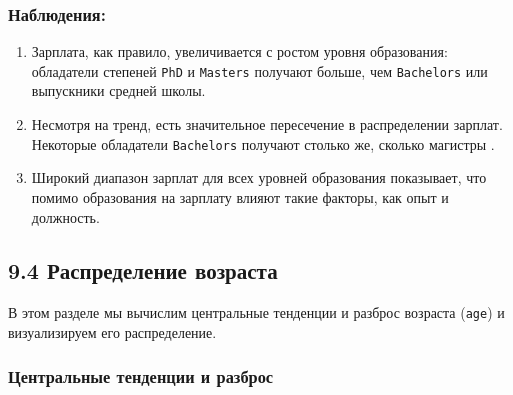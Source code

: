 \documentclass[
]{article}
\newenvironment{Shaded}{\begin{snugshade}}{\end{snugshade}}
\newcommand{\AttributeTok}[1]{\textcolor[rgb]{0.13,0.29,0.53}{#1}}
\newcommand{\CommentTok}[1]{\textcolor[rgb]{0.56,0.35,0.01}{\textit{#1}}}
\newcommand{\ConstantTok}[1]{\textcolor[rgb]{0.56,0.35,0.01}{#1}}
\newcommand{\FunctionTok}[1]{\textcolor[rgb]{0.13,0.29,0.53}{\textbf{#1}}}
\newcommand{\NormalTok}[1]{#1}
\newcommand{\OtherTok}[1]{\textcolor[rgb]{0.56,0.35,0.01}{#1}}
\newcommand{\SpecialCharTok}[1]{\textcolor[rgb]{0.81,0.36,0.00}{\textbf{#1}}}
\newcommand{\StringTok}[1]{\textcolor[rgb]{0.31,0.60,0.02}{#1}}
\providecommand{\tightlist}{%
  \setlength{\itemsep}{0pt}\setlength{\parskip}{0pt}}
\begin{document}
\subsubsection{Наблюдения:}\label{ux43dux430ux431ux43bux44eux434ux435ux43dux438ux44f-8}

\begin{enumerate}
\def\labelenumi{\arabic{enumi}.}
\tightlist
\item
  Зарплата, как правило, увеличивается с ростом уровня образования:
  обладатели степеней \texttt{PhD} и \texttt{Master\textquotesingle{}s}
  получают больше, чем \texttt{Bachelor\textquotesingle{}s} или
  выпускники средней школы.
\item
  Несмотря на тренд, есть значительное пересечение в распределении
  зарплат. Некоторые обладатели \texttt{Bachelor\textquotesingle{}s}
  получают столько же, сколько магистры .
\item
  Широкий диапазон зарплат для всех уровней образования показывает, что
  помимо образования на зарплату влияют такие факторы, как опыт и
  должность.
\end{enumerate}

\subsection{9.4 Распределение
возраста}\label{ux440ux430ux441ux43fux440ux435ux434ux435ux43bux435ux43dux438ux435-ux432ux43eux437ux440ux430ux441ux442ux430}

В этом разделе мы вычислим центральные тенденции и разброс возраста
(\texttt{age}) и визуализируем его распределение.

\subsubsection{Центральные тенденции и
разброс}\label{ux446ux435ux43dux442ux440ux430ux43bux44cux43dux44bux435-ux442ux435ux43dux434ux435ux43dux446ux438ux438-ux438-ux440ux430ux437ux431ux440ux43eux441}

\begin{Shaded}
\end{Shaded}
\end{document}

